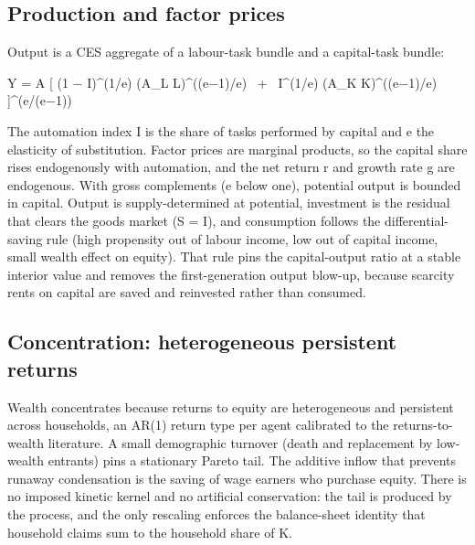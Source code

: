 \documentclass[11pt]{article}
\begin{document}
\hypertarget{production-and-factor-prices}{%
\subsection{Production and factor
prices}\label{production-and-factor-prices}}

Output is a CES aggregate of a labour-task bundle and a capital-task
bundle:

Y = A \textperiodcentered{} {[} (1 $-$ I)\^{}(1/e) \textperiodcentered{} (A\_L L)\^{}((e$-$1)/e) ~+~ I\^{}(1/e) \textperiodcentered{}
(A\_K K)\^{}((e$-$1)/e) {]}\^{}(e/(e$-$1))

The automation index I is the share of tasks performed by capital and e
the elasticity of substitution. Factor prices are marginal products, so
the capital share rises endogenously with automation, and the net return
r and growth rate g are endogenous. With gross complements (e below
one), potential output is bounded in capital. Output is
supply-determined at potential, investment is the residual that clears
the goods market (S = I), and consumption follows the
differential-saving rule (high propensity out of labour income, low out
of capital income, small wealth effect on equity). That rule pins the
capital-output ratio at a stable interior value and removes the
first-generation output blow-up, because scarcity rents on capital are
saved and reinvested rather than consumed.

\hypertarget{concentration-heterogeneous-persistent-returns}{%
\subsection{Concentration: heterogeneous persistent
returns}\label{concentration-heterogeneous-persistent-returns}}

Wealth concentrates because returns to equity are heterogeneous and
persistent across households, an AR(1) return type per agent calibrated
to the returns-to-wealth literature. A small demographic turnover (death
and replacement by low-wealth entrants) pins a stationary Pareto tail.
The additive inflow that prevents runaway condensation is the saving of
wage earners who purchase equity. There is no imposed kinetic kernel and
no artificial conservation: the tail is produced by the process, and the
only rescaling enforces the balance-sheet identity that household claims
sum to the household share of K.
\end{document}
